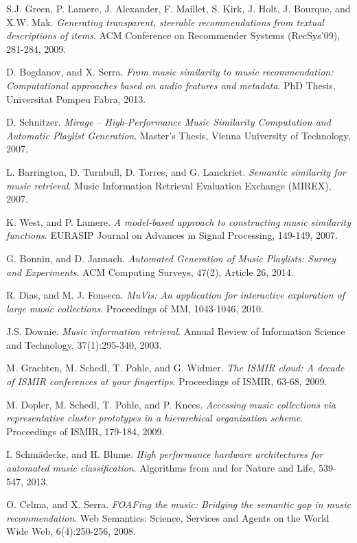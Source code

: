 \documentclass[11pt, oneside, openright]{Thesis} %
\begin{document}
\begin{thebibliography}{99}
S.J. Green, P. Lamere, J. Alexander, F. Maillet, S. Kirk, J. Holt, J. Bourque, and X.W. Mak.
\textit{Generating transparent, steerable recommendations from textual descriptions of items}.
ACM Conference on Recommender Systems (RecSys'09), 281-284, 2009.

D. Bogdanov, and X. Serra.
\textit{From music similarity to music recommendation: Computational approaches based on audio features and metadata}.
PhD Thesis, Universitat Pompeu Fabra, 2013.

D. Schnitzer.
\textit{Mirage – High-Performance Music Similarity Computation and Automatic Playlist Generation}.
Master's Thesis, Vienna University of Technology, 2007.

L. Barrington, D. Turnbull, D. Torres, and G. Lanckriet.
\textit{Semantic similarity for music retrieval}.
Music Information Retrieval Evaluation Exchange (MIREX), 2007.

K. West, and P. Lamere.
\textit{A model-based approach to constructing music similarity functions}.
EURASIP Journal on Advances in Signal Processing, 149-149, 2007.

G. Bonnin, and D. Jannach.
\textit{Automated Generation of Music Playlists: Survey and Experiments}.
ACM Computing Surveys, 47(2), Article 26, 2014.

R. Dias, and M. J. Fonseca.
\textit{MuVis: An application for interactive exploration of large music collections}.
Proceedings of MM, 1043-1046, 2010.

J.S. Downie.
\textit{Music information retrieval}.
Annual Review of Information Science and Technology, 37(1):295-340, 2003.

M. Grachten, M. Schedl, T. Pohle, and G. Widmer.
\textit{The ISMIR cloud: A decade of ISMIR conferences at your fingertips}.
Proceedings of ISMIR, 63-68, 2009.

M. Dopler, M. Schedl, T. Pohle, and P. Knees.
\textit{Accessing music collections via representative cluster prototypes in a hierarchical organization scheme}.
Proceedings of ISMIR, 179-184, 2009.

I. Schm\"{a}decke, and H. Blume.
\textit{High performance hardware architectures for automated music classification}.
Algorithms from and for Nature and Life, 539-547, 2013.

O. Celma, and X. Serra.
\textit{FOAFing the music: Bridging the semantic gap in music recommendation}.
Web Semantics: Science, Services and Agents on the World Wide Web, 6(4):250-256, 2008.


\end{thebibliography}
\end{document}
